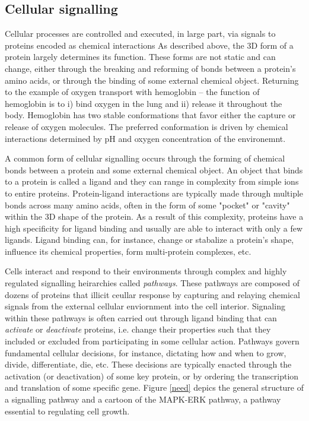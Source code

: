 \subsection{Cellular signalling}
Cellular processes are controlled and executed, in large part, via signals to proteins encoded as chemical interactions
As described above, the 3D form of a protein largely determines its function.
These forms are not static and can change, either through the breaking and reforming of bonds between a protein's amino acids, or through the binding of some external chemical object.
Returning to the example of oxygen transport with hemoglobin -- the function of hemoglobin is to i) bind oxygen in the lung and ii) release it throughout the body.
Hemoglobin has two stable conformations that favor either the capture or release of oxygen molecules.
The preferred conformation is driven by chemical interactions determined by pH and oxygen concentration of the environemnt.

A common form of cellular signalling occurs through the forming of chemical bonds between a protein and some external chemical object.
An object that binds to a protein is called a ligand and they can range in complexity from simple ions to entire proteins.
Protein-ligand interactions are typically made through multiple bonds across many amino acids, often in the form of some "pocket" or "cavity" within the 3D shape of the protein.
As a result of this complexity, proteins have a high specificity for ligand binding and usually are able to interact with only a few ligands.
Ligand binding can, for instance, change or stabalize a protein's shape, influence its chemical properties, form multi-protein complexes, etc.

Cells interact and respond to their environments through complex and highly regulated signalling heirarchies called \emph{pathways}.
These pathways are composed of dozens of proteins that illicit ceullar response by capturing and relaying chemical signals from the external cellular enviornment into the cell interior.
Signaling within these pathways is often carried out through ligand binding that can \emph{activate} or \emph{deactivate} proteins, i.e. change their properties such that they included or excluded from participating in some cellular action.
Pathways govern fundamental cellular decisions, for instance, dictating how and when to grow, divide, differentiate, die, etc.
These decisions are typically enacted through the activation (or deactivation) of some key protein, or by ordering the transcription and translation of some specific gene.
Figure \ref{need} depics the general structure of a signalling pathway and a cartoon of the MAPK-ERK pathway, a pathway essential to regulating cell growth.

